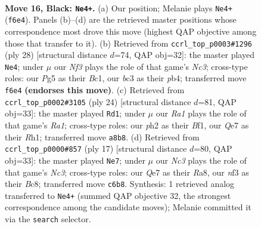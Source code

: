 \documentclass[11pt]{article}
\begin{document}
\clearpage

\begin{figure}[p]\centering
\begin{subfigure}{0.46\textwidth}\centering
\resizebox{\linewidth}{!}{%
\newchessgame
\chessboard[
  setfen={r1b2r2/p1ppqp2/2n1pn1k/1QP3pp/8/2B2NP1/PP1KPP1P/R4B1R b - - 0 16},
  showmover=false,
  pgfstyle=straightmove, color=movearrow, markmove={f6-e4}
]}
\caption{}
\end{subfigure}\hfill
\begin{subfigure}{0.46\textwidth}\centering
\resizebox{\linewidth}{!}{%
\newchessgame
\chessboard[
  setfen={r1b2r1k/1p2ppbp/2nq2p1/3P4/1p6/1QN2N2/PP3PPP/R1B2RK1 w - - 0 15},
  showmover=false,
  pgfstyle=straightmove, color=movearrow, markmove={c3-e4}
]}
\caption{}
\end{subfigure}
\\[4pt]
\begin{subfigure}{0.46\textwidth}\centering
\resizebox{\linewidth}{!}{%
\newchessgame
\chessboard[
  setfen={r1br2k1/1p1npp1p/1q3bp1/p2P4/4P3/1NN1Q3/PP3PPP/R3KB1R w KQ - 2 13},
  showmover=false,
  pgfstyle=straightmove, color=movearrow, markmove={a1-d1}
]}
\caption{}
\end{subfigure}\hfill
\begin{subfigure}{0.46\textwidth}\centering
\resizebox{\linewidth}{!}{%
\newchessgame
\chessboard[
  setfen={r1bqk2r/1pp2ppp/2np1n2/p2P4/8/P1Q2N2/1P2PPPP/R1B1KB1R b KQkq - 0 9},
  showmover=false,
  pgfstyle=straightmove, color=movearrow, markmove={c6-e7}
]}
\caption{}
\end{subfigure}
\caption{\textbf{Move 16, Black: \texttt{Ne4+}.} (a) Our position; Melanie plays \texttt{Ne4+} (\texttt{f6e4}). Panels (b)--(d) are the retrieved master positions whose correspondence most drove this move (highest QAP objective among those that transfer to it). (b) Retrieved from \texttt{ccrl\_top\_p0003\#1296} (ply 28) [structural distance $d$=74, QAP obj=32]: the master played \texttt{Ne4}; under $\mu$ our \emph{Nf3} plays the role of that game's \emph{Nc3}; cross-type roles: our \emph{P}g5 as their \emph{B}c1, our \emph{b}c3 as their \emph{p}b4; transferred move \texttt{f6e4} \textbf{(endorses this move)}. (c) Retrieved from \texttt{ccrl\_top\_p0002\#3105} (ply 24) [structural distance $d$=81, QAP obj=33]: the master played \texttt{Rd1}; under $\mu$ our \emph{Ra1} plays the role of that game's \emph{Ra1}; cross-type roles: our \emph{p}h2 as their \emph{B}f1, our \emph{Q}e7 as their \emph{R}h1; transferred move \texttt{a8b8}. (d) Retrieved from \texttt{ccrl\_top\_p0000\#857} (ply 17) [structural distance $d$=80, QAP obj=33]: the master played \texttt{Ne7}; under $\mu$ our \emph{Nc3} plays the role of that game's \emph{Nc3}; cross-type roles: our \emph{Q}e7 as their \emph{R}a8, our \emph{n}f3 as their \emph{B}c8; transferred move \texttt{c6b8}. Synthesis: 1 retrieved analog transferred to \texttt{Ne4+} (summed QAP objective 32, the strongest correspondence among the candidate moves); Melanie committed it via the \texttt{search} selector.}
\label{fig:thought-m31}
\end{figure}
\end{document}
